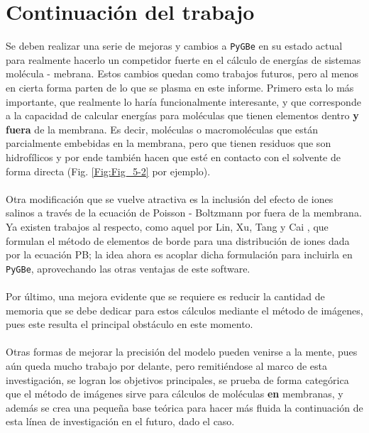\documentclass[12pt, oneside, numbers, spanish]{ezthesis}
\numberwithin{equation}{section}
\begin{document}
\section{Continuación del trabajo}
Se deben realizar una serie de mejoras y cambios a \texttt{PyGBe} en su estado actual para realmente hacerlo un competidor fuerte en el cálculo de energías de sistemas molécula - mebrana. Estos cambios quedan como trabajos futuros, pero al menos en cierta forma parten de lo que se plasma en este informe. Primero esta lo más importante, que realmente lo haría funcionalmente interesante, y que corresponde a la capacidad de calcular energías para moléculas que tienen elementos dentro \textbf{y fuera} de la membrana. Es decir, moléculas o macromoléculas que están parcialmente embebidas en la membrana, pero que tienen residuos que son hidrofílicos y por ende también hacen que esté en contacto con el solvente de forma directa (Fig. \ref{Fig:Fig_5-2} por ejemplo).\\\\
Otra modificación que se vuelve atractiva es la inclusión del efecto de iones salinos a través de la ecuación de Poisson - Boltzmann por fuera de la membrana. Ya existen trabajos al respecto, como aquel por Lin, Xu, Tang y Cai \cite{Huimin-Lin}, que formulan el método de elementos de borde para una distribución de iones dada por la ecuación PB; la idea ahora es acoplar dicha formulación para incluirla en \texttt{PyGBe}, aprovechando las otras ventajas de este software.\\\\
Por último, una mejora evidente que se requiere es reducir la cantidad de memoria que se debe dedicar para estos cálculos mediante el método de imágenes, pues este resulta el principal obstáculo en este momento.\\\\
Otras formas de mejorar la precisión del modelo pueden venirse a la mente, pues aún queda mucho trabajo por delante, pero remitiéndose al marco de esta investigación, se logran los objetivos principales, se prueba de forma categórica que el método de imágenes sirve para cálculos de moléculas \textbf{en} membranas, y además se crea una pequeña base teórica para hacer más fluida la continuación de esta línea de investigación en el futuro, dado el caso.

\pagebreak
\end{document}
